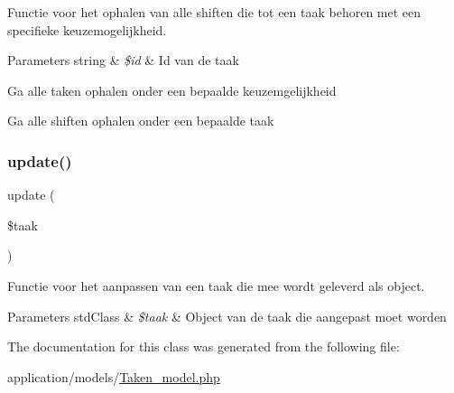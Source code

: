 Functie voor het ophalen van alle shiften die tot een taak behoren met een specifieke keuzemogelijkheid. 


\begin{DoxyParams}[1]{Parameters}
string & {\em \$id} & Id van de taak \\
\hline
\end{DoxyParams}
Ga alle taken ophalen onder een bepaalde keuzemgelijkheid

Ga alle shiften ophalen onder een bepaalde taak \mbox{\label{class_taken___model_a2fdc722cb2e60f87bc93a5f2390f88bc}} 
\subsubsection{\texorpdfstring{update()}{update()}}
{\footnotesize\ttfamily update (\begin{DoxyParamCaption}\item[{}]{\$taak }\end{DoxyParamCaption})}



Functie voor het aanpassen van een taak die mee wordt geleverd als object. 


\begin{DoxyParams}[1]{Parameters}
std\+Class & {\em \$taak} & Object van de taak die aangepast moet worden \\
\hline
\end{DoxyParams}


The documentation for this class was generated from the following file\+:\begin{DoxyCompactItemize}
\item 
application/models/\mbox{\hyperlink{_taken__model_8php}{Taken\+\_\+model.\+php}}\end{DoxyCompactItemize}

